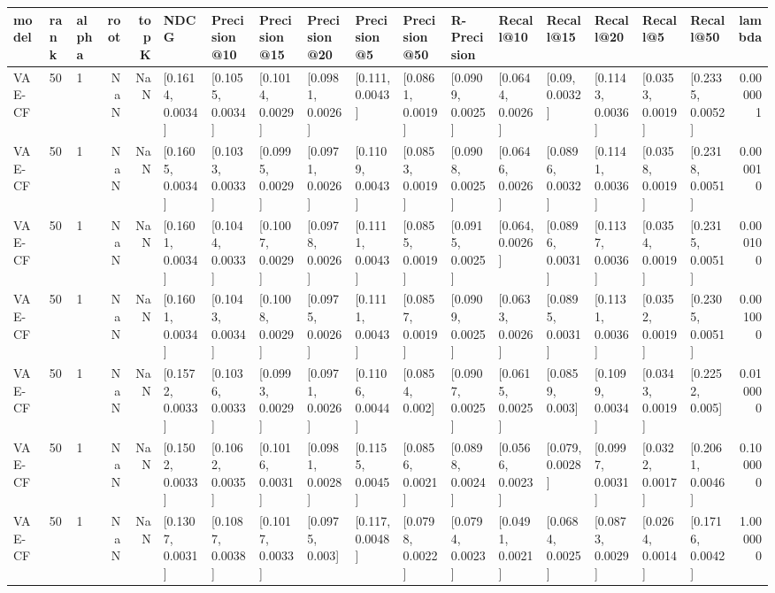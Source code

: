 \begin{tabular}{lllrrllllllllllllr}
\toprule
   model & rank & alpha &  root &  topK &              NDCG &      Precision@10 &      Precision@15 &      Precision@20 &       Precision@5 &      Precision@50 &       R-Precision &         Recall@10 &         Recall@15 &         Recall@20 &          Recall@5 &         Recall@50 &    lambda \\
\midrule
  VAE-CF &   50 &     1 &   NaN &   NaN &  [0.1614, 0.0034] &  [0.1055, 0.0034] &  [0.1014, 0.0029] &  [0.0981, 0.0026] &   [0.111, 0.0043] &  [0.0861, 0.0019] &  [0.0909, 0.0025] &  [0.0644, 0.0026] &    [0.09, 0.0032] &  [0.1143, 0.0036] &  [0.0353, 0.0019] &  [0.2335, 0.0052] &  0.000001 \\
  VAE-CF &   50 &     1 &   NaN &   NaN &  [0.1605, 0.0034] &  [0.1033, 0.0033] &  [0.0995, 0.0029] &  [0.0971, 0.0026] &  [0.1109, 0.0043] &  [0.0853, 0.0019] &  [0.0908, 0.0025] &  [0.0646, 0.0026] &  [0.0896, 0.0032] &  [0.1141, 0.0036] &  [0.0358, 0.0019] &  [0.2318, 0.0051] &  0.000010 \\
  VAE-CF &   50 &     1 &   NaN &   NaN &  [0.1601, 0.0034] &  [0.1044, 0.0033] &  [0.1007, 0.0029] &  [0.0978, 0.0026] &  [0.1111, 0.0043] &  [0.0855, 0.0019] &  [0.0915, 0.0025] &   [0.064, 0.0026] &  [0.0896, 0.0031] &  [0.1137, 0.0036] &  [0.0354, 0.0019] &  [0.2315, 0.0051] &  0.000100 \\
  VAE-CF &   50 &     1 &   NaN &   NaN &  [0.1601, 0.0034] &  [0.1043, 0.0034] &  [0.1008, 0.0029] &  [0.0975, 0.0026] &  [0.1111, 0.0043] &  [0.0857, 0.0019] &  [0.0909, 0.0025] &  [0.0633, 0.0026] &  [0.0895, 0.0031] &  [0.1131, 0.0036] &  [0.0352, 0.0019] &  [0.2305, 0.0051] &  0.001000 \\
  VAE-CF &   50 &     1 &   NaN &   NaN &  [0.1572, 0.0033] &  [0.1036, 0.0033] &  [0.0993, 0.0029] &  [0.0971, 0.0026] &  [0.1106, 0.0044] &   [0.0854, 0.002] &  [0.0907, 0.0025] &  [0.0615, 0.0025] &   [0.0859, 0.003] &  [0.1099, 0.0034] &  [0.0343, 0.0019] &   [0.2252, 0.005] &  0.010000 \\
  VAE-CF &   50 &     1 &   NaN &   NaN &  [0.1502, 0.0033] &  [0.1062, 0.0035] &  [0.1016, 0.0031] &  [0.0981, 0.0028] &  [0.1155, 0.0045] &  [0.0856, 0.0021] &  [0.0898, 0.0024] &  [0.0566, 0.0023] &   [0.079, 0.0028] &  [0.0997, 0.0031] &  [0.0322, 0.0017] &  [0.2061, 0.0046] &  0.100000 \\
  VAE-CF &   50 &     1 &   NaN &   NaN &  [0.1307, 0.0031] &  [0.1087, 0.0038] &  [0.1017, 0.0033] &   [0.0975, 0.003] &   [0.117, 0.0048] &  [0.0798, 0.0022] &  [0.0794, 0.0023] &  [0.0491, 0.0021] &  [0.0684, 0.0025] &  [0.0873, 0.0029] &  [0.0264, 0.0014] &  [0.1716, 0.0042] &  1.000000 \\

\end{tabular}

